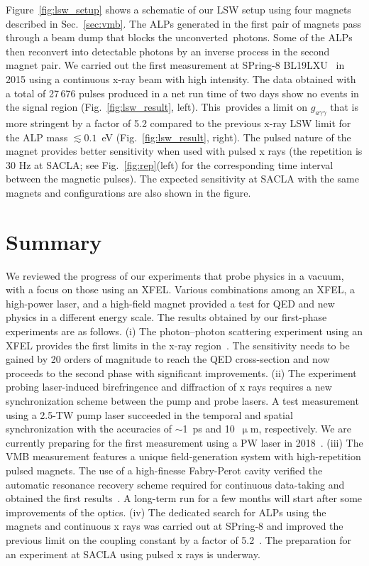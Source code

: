 \documentclass[10pt,a4paper]{article}%
\begin{document}
Figure~\ref{fig:lsw_setup} shows a schematic of our LSW setup using four magnets described in Sec.~\ref{sec:vmb}.
The ALPs generated in the first pair of magnets pass through a beam dump that blocks the unconverted~photons.
Some of the ALPs then reconvert into detectable photons by an inverse process in the second magnet pair.
We carried out the first measurement at SPring-8 BL19LXU~\cite{bl19} in 2015 using a continuous x-ray beam with high intensity.
The data obtained with a total of 27\,676 pulses produced in a net run time of two days show no events in the signal region (Fig.~\ref{fig:lsw_result}, left).
This~provides a limit on $g_{a \gamma \gamma}$ that is more stringent by a factor of 5.2 compared to the previous x-ray LSW limit for the ALP mass $\lesssim0.1$~eV (Fig.~\ref{fig:lsw_result}, right).
The pulsed nature of the magnet provides better sensitivity when used with pulsed x rays (the repetition is 30 Hz at SACLA; see Fig.~\ref{fig:rep}(left) for the corresponding time interval between the magnetic pulses).
The expected sensitivity at SACLA with the same magnets and configurations are also shown in the figure.

\section{Summary}\label{sec:conclusion}

We reviewed the progress of our experiments that probe physics in a vacuum, with a focus on those using an XFEL.
Various combinations among an XFEL, a high-power laser, and a high-field magnet provided a test for QED and new physics in a different energy scale.
The results obtained by our first-phase experiments are as follows.
(i) The photon--photon scattering experiment using an XFEL provides the first limits in the x-ray region~\cite{gg1, gg2}.
The sensitivity needs to be gained by 20 orders of magnitude to reach the QED cross-section and now proceeds to the second phase with significant improvements.
(ii) The experiment probing laser-induced birefringence and diffraction of x rays requires a new synchronization scheme between the pump and probe lasers.
A test measurement using a 2.5-TW pump laser succeeded in the temporal and spatial synchronization with the accuracies of $\sim$1~ps and 10~$\upmu$m, respectively.
We are currently preparing for the first measurement using a PW laser in 2018~\cite{seino}.
(iii) The VMB measurement features a unique field-generation system with high-repetition pulsed magnets.
The use of a high-finesse Fabry-Perot cavity verified the automatic resonance recovery scheme required for continuous data-taking and obtained the first results~\cite{pulse_mag,fan}.
A long-term run for a few months will start after some improvements of the optics.
(iv) The dedicated search for ALPs using the magnets and continuous x rays was carried out at SPring-8 and improved the previous limit on the coupling constant by a factor of 5.2~\cite{spring-8}.
The preparation for an experiment at SACLA using pulsed x rays is underway.
\end{document}

